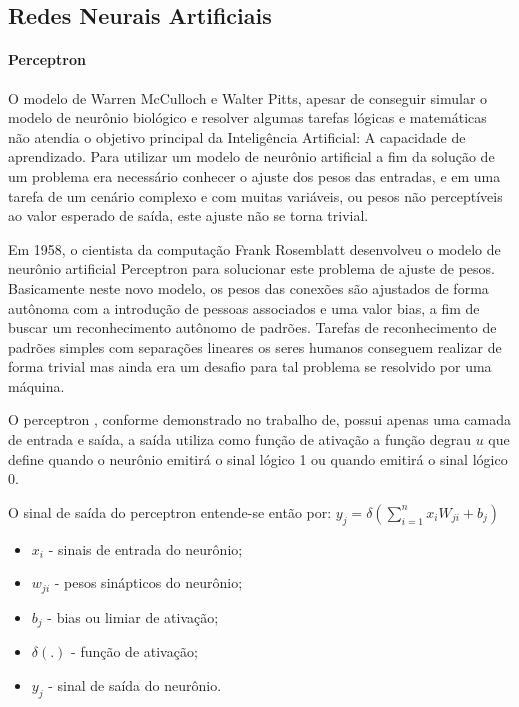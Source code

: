 \documentclass[	12pt, Times, openright, twoside, a4paper, english, brazil]{abntex2}
\begin{document}
        \subsection{Redes Neurais Artificiais}
          \paragraph*{Perceptron}
            O modelo de Warren McCulloch e Walter Pitts, apesar de conseguir simular o modelo de neurônio biológico e resolver algumas tarefas lógicas e matemáticas não atendia o objetivo principal da Inteligência Artificial: A capacidade de aprendizado.
            Para utilizar um modelo de neurônio artificial a fim da solução de um problema era necessário conhecer o ajuste dos pesos das entradas, e em uma tarefa de um cenário complexo e com muitas variáveis, ou pesos não perceptíveis ao valor esperado de saída, este ajuste não se torna trivial.
            
            Em 1958, o cientista da computação Frank Rosemblatt desenvolveu o modelo de neurônio artificial Perceptron para solucionar este problema de ajuste de pesos.
            Basicamente neste novo modelo, os pesos das conexões são ajustados de forma autônoma com a introdução de pessoas associados e uma valor bias, a fim de buscar um reconhecimento autônomo de padrões. Tarefas de reconhecimento de padrões simples com separações lineares os seres humanos conseguem realizar de forma trivial mas ainda era um desafio para tal problema se resolvido por uma máquina.

            O perceptron , conforme demonstrado no trabalho de\cite{Flavia2014}, possui apenas uma camada de entrada e saída, a saída utiliza como função de ativação a função degrau $u$ que define quando o neurônio emitirá o sinal lógico 1 ou quando emitirá o sinal lógico 0.

            O sinal de saída do perceptron entende-se então por:
            $y_j= \delta(\sum_{i=1}^{n}x_i W_{ji}+b_j)$
            \begin{itemize}
            	\item $ x_i $ - sinais de entrada do neurônio;
            	\item $ w_{ji} $ - pesos sinápticos do neurônio;
            	\item $ b_j $ - bias ou limiar de ativação;
            	\item $ \delta(.) $ - função de ativação;
            	\item $ y_j $ - sinal de saída do neurônio.
            \end{itemize}
			
\end{document}
